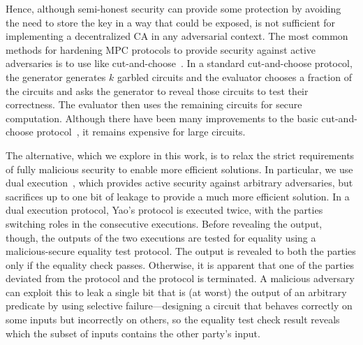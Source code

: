 Hence, although semi-honest security can provide some protection by avoiding the need to store the key in a way that could be exposed, is not sufficient for implementing a decentralized CA in any adversarial context.  The most common methods for hardening MPC protocols to provide security against active adversaries is to use like cut-and-choose~\cite{lindell2007efficient}.
In a standard cut-and-choose protocol, the generator generates $k$ garbled circuits and the evaluator chooses a fraction of the circuits and asks the generator to reveal those circuits to test their correctness. The evaluator then uses the remaining circuits for secure computation.  Although there have been many improvements to the basic cut-and-choose protocol~\cite{afshar2015efficiently, afshar2014non, brandao2013secure, frederiksen2013minilego, huang2014amortizing, kreuter2012billion, lindell2016fast, lindell2012secure, lindell2008implementing, lindell2014cut, lindell2015blazing, nielsen2009lego, pinkas2009secure, shen2011two, shen2013fast, woodruff2007revisiting}, it remains expensive for large circuits.


 The alternative, which we explore in this work, is to relax the strict requirements of fully malicious security to enable more efficient solutions. In particular, we use dual execution~\cite{mohassel2013garbled, huang2012quid}, which provides active security against arbitrary adversaries, but sacrifices up to one bit of leakage to provide a much more efficient solution. In a dual execution protocol, Yao's protocol is executed twice, with the parties switching roles in the consecutive executions. Before revealing the output, though, the outputs of the two executions are tested for equality using a malicious-secure equality test protocol. The output is revealed to both the parties only if the equality check passes.  Otherwise, it is apparent that one of the parties deviated from the protocol and the protocol is terminated.  A malicious adversary can exploit this to leak a single bit that is (at worst) the output of an arbitrary predicate by using selective failure---designing a circuit that behaves correctly on some inputs but incorrectly on others, so the equality test check result reveals which the subset of inputs contains the other party's input.  


